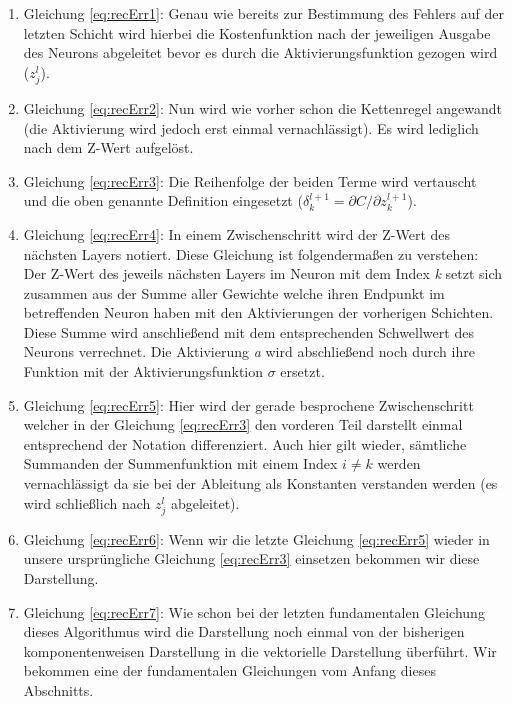 \begin{enumerate}

\item Gleichung \ref{eq:recErr1}: Genau wie bereits zur Bestimmung des Fehlers auf der letzten Schicht wird hierbei die Kostenfunktion nach der jeweiligen Ausgabe des Neurons abgeleitet bevor es durch die Aktivierungsfunktion gezogen wird ($z^l_j$).

\item Gleichung \ref{eq:recErr2}: Nun wird wie vorher schon die Kettenregel angewandt (die Aktivierung wird jedoch erst einmal vernachlässigt). Es wird lediglich nach dem Z-Wert aufgelöst.

\item Gleichung \ref{eq:recErr3}: Die Reihenfolge der beiden Terme wird vertauscht und die oben genannte Definition eingesetzt ($\delta^{l+1}_k = \partial C / \partial z^{l+1}_k$).

\item Gleichung \ref{eq:recErr4}: In einem Zwischenschritt wird der Z-Wert des nächsten Layers notiert. Diese Gleichung ist folgendermaßen zu verstehen: Der Z-Wert des jeweils nächsten Layers im Neuron mit dem Index \emph{k} setzt sich zusammen aus der Summe aller Gewichte welche ihren Endpunkt im betreffenden Neuron haben mit den Aktivierungen der vorherigen Schichten. Diese Summe wird anschließend mit dem entsprechenden Schwellwert des Neurons verrechnet. Die Aktivierung \emph{a} wird abschließend noch durch ihre Funktion mit der Aktivierungsfunktion $\sigma$ ersetzt.

\item Gleichung \ref{eq:recErr5}: Hier wird der gerade besprochene Zwischenschritt welcher in der Gleichung \ref{eq:recErr3} den vorderen Teil darstellt einmal entsprechend der Notation differenziert. Auch hier gilt wieder, sämtliche Summanden der Summenfunktion mit einem Index $i \neq k$ werden vernachlässigt da sie bei der Ableitung als Konstanten verstanden werden (es wird schließlich nach $z^l_j$ abgeleitet).

\item Gleichung \ref{eq:recErr6}: Wenn wir die letzte Gleichung \ref{eq:recErr5} wieder in unsere ursprüngliche Gleichung \ref{eq:recErr3} einsetzen bekommen wir diese Darstellung.

\item Gleichung \ref{eq:recErr7}: Wie schon bei der letzten fundamentalen Gleichung dieses Algorithmus wird die Darstellung noch einmal von der bisherigen komponentenweisen Darstellung in die vektorielle Darstellung überführt. Wir bekommen eine der fundamentalen Gleichungen vom Anfang dieses Abschnitts.

\end{enumerate}




